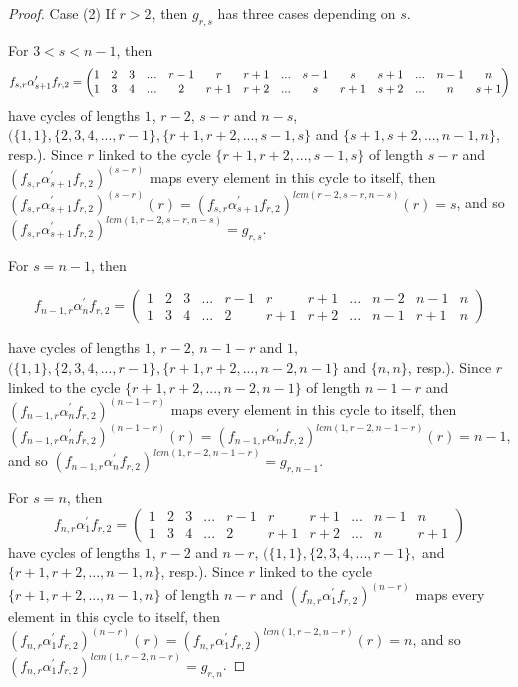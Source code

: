 \documentclass[10pt]{extarticle}
\numberwithin{equation}{section}
\numberwithin{bbb}{section}
\numberwithin{equation}{section}
\begin{document}
\begin{proof}
\vspace{1cm}
Case (2) If $r>2$, then $g_{r,s}$ has three cases depending on $s$.

\vspace{0.5cm}
For $3<s<n-1$, then 
$$f_{s,r} \alpha^{\prime}_{s+1}f_{r,2}=
\setcounter{MaxMatrixCols}{14}
\begin{pmatrix}
1&2&3&...&r-1&r&r+1&...&s-1&s&s+1&...&n-1&n\\1&3&4&...&2&r+1&r+2&...&s&r+1&s+2&...&n&s+1
\end{pmatrix}$$
have cycles of lengths $1$, $r-2$, $s-r$ and $n-s$, $( \{1,1\}, \{2,3,4,...,r-1\}, \{r+1,r+2,...,s-1,s\}$ and $\{s+1,s+2,...,n-1,n\}$, resp.). Since $r$ linked to the cycle $\{r+1,r+2,...,s-1,s\}$ of length $s-r$ and $(f_{s,r} \alpha^{\prime}_{s+1}f_{r,2})^{(s-r)}$ maps every element in this cycle to itself, then $(f_{s,r} \alpha^{\prime}_{s+1}f_{r,2})^{(s-r)}(r)=(f_{s,r} \alpha^{\prime}_{s+1}f_{r,2})^{lcm(r-2,s-r,n-s)}(r)=s$, and so $(f_{s,r} \alpha^{\prime}_{s+1}f_{r,2})^{lcm(1,r-2,s-r,n-s)}=g_{r,s}$.

\vspace{0.5cm}
For $s=n-1$, then

$$f_{n-1,r} \alpha^{\prime}_{n}f_{r,2}=
\begin{pmatrix}  
1&2&3&...&r-1&r&r+1&...&n-2&n-1&n\\1&3&4&...&2&r+1&r+2&...&n-1&r+1&n
\end{pmatrix}$$ 


have cycles of lengths $1$, $r-2$, $n-1-r$ and $1$,  $( \{1,1\}, \{2,3,4,...,r-1\}, \{r+1,r+2,...,n-2,n-1\}$ and $\{n,n\}$, resp.). Since $r$ linked to the cycle $\{r+1,r+2,...,n-2,n-1\}$ of length $n-1-r$ and $(f_{n-1,r} \alpha^{\prime}_{n}f_{r,2})^{(n-1-r)}$ maps every element in this cycle to itself, then $(f_{n-1,r} \alpha^{\prime}_{n}f_{r,2})^{(n-1-r)}(r)=(f_{n-1,r} \alpha^{\prime}_{n}f_{r,2})^{lcm(1,r-2,n-1-r)}(r)=n-1$, and so $(f_{n-1,r} \alpha^{\prime}_{n}f_{r,2})^{lcm(1,r-2,n-1-r)}=g_{r,n-1}$.

\vspace{0.5cm}
For $s=n$, then 
$$f_{n,r} \alpha^{\prime}_{1}f_{r,2}=
\begin{pmatrix}  
1&2&3&...&r-1&r&r+1&...&n-1&n\\1&3&4&...&2&r+1&r+2&...&n&r+1
\end{pmatrix}$$
have cycles of lengths $1$, $r-2$ and $n-r$, $( \{1,1\}, \{2,3,4,...,r-1\},$ and $\{r+1,r+2,...,n-1,n\}$, resp.). Since $r$ linked to the cycle $\{r+1,r+2,...,n-1,n\}$ of length $n-r$ and $(f_{n,r} \alpha^{\prime}_{1}f_{r,2})^{(n-r)}$ maps every element in this cycle to itself, then $(f_{n,r} \alpha^{\prime}_{1}f_{r,2})^{(n-r)}(r)=(f_{n,r} \alpha^{\prime}_{1}f_{r,2})^{lcm(1,r-2,n-r)}(r)=n$,
and so $(f_{n,r} \alpha^{\prime}_{1}f_{r,2})^{lcm(1,r-2,n-r)}=g_{r,n}$.


\end{proof}
\end{document}
